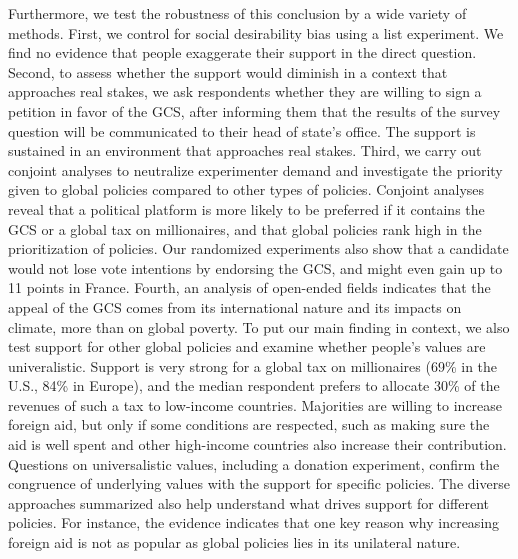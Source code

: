 \documentclass[12pt,english]{article}
\begin{document}
Furthermore, we test the robustness of this conclusion by a wide variety of methods. First, we control for social desirability bias using a list experiment. We find no evidence that people exaggerate their support in the direct question. Second, to assess whether the support would diminish in a context that approaches real stakes, we ask respondents whether they are willing to sign a petition in favor of the GCS, after informing them that the results of the survey question will be communicated to their head of state's office. The support is sustained in an environment that approaches real stakes. Third, we carry out conjoint analyses to neutralize experimenter demand and investigate the priority given to global policies compared to other types of policies. Conjoint analyses reveal that a political platform is more likely to be preferred if it contains the GCS or a global tax on millionaires, and that global policies rank high in the prioritization of policies. Our randomized experiments also show that a candidate would not lose vote intentions by endorsing the GCS, and might even gain up to 11 points in France. Fourth, an analysis of open-ended fields indicates that the appeal of the GCS comes from its international nature and its impacts on climate, more than on global poverty. %
To put our main finding in context, we also test support for other global policies and examine whether people's values are univeralistic. Support is very strong for a global tax on millionaires (69\% in the U.S., 84\% in Europe), and the median respondent prefers to allocate 30\% of the revenues of such a tax to low-income countries. Majorities are willing to increase foreign aid, but only if some conditions are respected, such as making sure the aid is well spent and other high-income countries also increase their contribution. Questions on universalistic values, including a donation experiment, confirm the congruence of underlying values with the support for specific policies. The diverse approaches summarized also help understand what drives support for different policies. For instance, the evidence indicates that one key reason why increasing foreign aid is not as popular as global policies lies in its unilateral nature.
\end{document}
